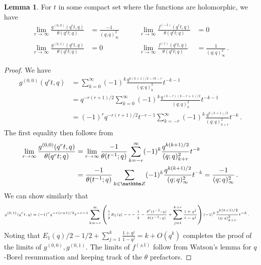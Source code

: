 \documentclass[12pt,reqno]{amsart}
\theoremstyle{definition}
\newtheorem{lemma}[theorem]{Lemma}
\def\BZ{\mathbbm Z}
\def\be{\begin{equation}}
\def\ee{\end{equation}}
\begin{document}
\begin{lemma}
\label{lem.fglimits}
  For $t$ in some compact set where the functions are holomorphic, we have
\be
\begin{aligned}
\lim_{r\rightarrow\infty}\frac{g^{(0,0)}(q^{r}t,q)}{\theta(q^{r}t;q)}
&=
\frac{-1}{(q;q)_{\infty}^{2}}\qquad
&
\lim_{r\rightarrow\infty}\frac{f^{(-1)}(q^{r}t,q)}{\theta(q^{r}t;q)}
&=
0
\\
\lim_{r\rightarrow\infty}\frac{g^{(0,1)}(q^{r}t,q)}{\theta(q^{r}t;q)}
&=
0\qquad
&
\lim_{r\rightarrow\infty}\frac{f^{(1)}(q^{r}t,q)}{\theta(q^{r}t;q)}
&=
\frac{1}{(q;q)_{\infty}^{2}}\,.
  \end{aligned}
\ee
\end{lemma}

\begin{proof}
We have
\be
\begin{aligned}
g^{(0,0)}(q^{r}t,q)
&=
\sum_{k=0}^{\infty}(-1)^{k}\frac{q^{k(k+1)/2-rk-r}}{(q;q)_{k}^{2}}t^{-k-1}\\
&=
q^{-r(r+1)/2}\sum_{k=0}^{\infty}(-1)^{k}
\frac{q^{(k-r)(k-r+1)/2}}{(q;q)_{k}^{2}}t^{-k-1}\\
&=
(-1)^{r}q^{-r(r+1)/2}t^{-r-1}\sum_{k=-r}^{\infty}(-1)^{k}
\frac{q^{k(k+1)/2}}{(q;q)_{k+r}^{2}}t^{-k}\,.
\end{aligned}
\ee
The first equality then follows from
\begin{align*}
\lim_{r\rightarrow\infty}\frac{g^{(0,0)}(q^{r}t,q)}{\theta(q^{r}t;q)}
&=
\lim_{r\rightarrow\infty}\frac{-1}{\theta(t^{-1};q)}
\sum_{k=-r}^{\infty}(-1)^{k}\frac{q^{k(k+1)/2}}{(q;q)_{k+r}^{2}}t^{-k}
\\
&=
\frac{-1}{\theta(t^{-1};q)}\sum_{k\in\BZ}(-1)^{k}
\frac{q^{k(k+1)/2}}{(q;q)_{\infty}^{2}}t^{-k}
=\frac{-1}{(q;q)_{\infty}^{2}} \,.
\end{align*}
We can show similarly that
\be
\begin{tiny}
\begin{aligned}
g^{(0,1)}(q^{r}t,q)
&=
(-1)^{r}q^{-r(r+1)/2}t^{-r-1}\sum_{k=-r}^{\infty}\left(\frac{1}{2}E_{1}(q)-r-\frac{1}{2}-\frac{\theta'(t^{-1};q)}{\theta(t^{-1};q)}+\sum_{j=1}^{k+r}\frac{1+q^{j}}{1-q^{j}}\right)
(-1)^{k}\frac{q^{k(k+1)/2}}{(q;q)_{k+r}^{2}}t^{-k} \,.
\end{aligned}
\end{tiny}
\ee
Noting that $E_{1}(q)/2-1/2+\sum_{j=1}^{k}\frac{1+q^{j}}{1-q^{j}}=k+O(q^{k})$ completes the proof of the limits of
$g^{(0,0)},g^{(0,1)}$. The limits of $f^{(\pm1)}$ follow from Watson's lemma for
$q$-Borel resummation and keeping track of the $\theta$ prefactors.
\end{proof}
\end{document}
